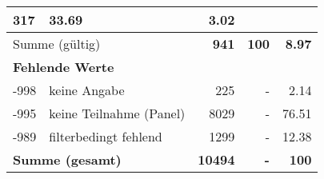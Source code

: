 \begin{longtable}{lXrrr}
       \num{317} &
       \num[round-mode=places,round-precision=2]{33,69} &
         \num[round-mode=places,round-precision=2]{3,02} \\
     \midrule
     \multicolumn{2}{l}{Summe (gültig)} &
       \textbf{\num{941}} &
     \textbf{100} &
       \textbf{\num[round-mode=places,round-precision=2]{8,97}} \\
     \multicolumn{5}{l}{\textbf{Fehlende Werte}}\\
       -998 &
       keine Angabe &
         \num{225} &
        - &
         \num[round-mode=places,round-precision=2]{2,14} \\
       -995 &
       keine Teilnahme (Panel) &
         \num{8029} &
        - &
         \num[round-mode=places,round-precision=2]{76,51} \\
       -989 &
       filterbedingt fehlend &
         \num{1299} &
        - &
         \num[round-mode=places,round-precision=2]{12,38} \\
     \midrule
     \multicolumn{2}{l}{\textbf{Summe (gesamt)}} &
          \textbf{\num{10494}} &
        \textbf{-} &
        \textbf{100} \\
     \bottomrule
     \end{longtable}
     
